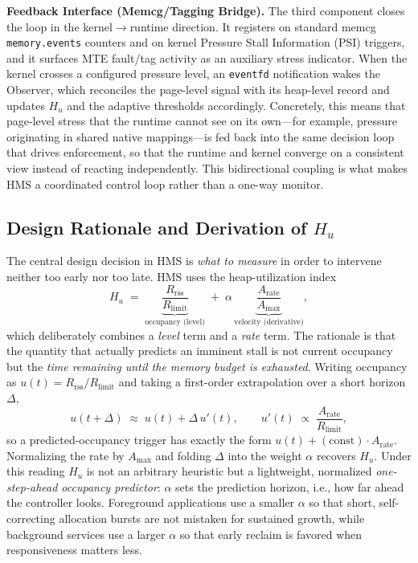 \textbf{ Feedback Interface (Memcg/Tagging Bridge).}
The third component closes the loop in the kernel$\rightarrow$runtime direction. It registers on standard memcg \texttt{memory.events} counters and on kernel Pressure Stall Information (PSI) triggers, and it surfaces MTE fault/tag activity as an auxiliary stress indicator. When the kernel crosses a configured pressure level, an \texttt{eventfd} notification wakes the Observer, which reconciles the page-level signal with its heap-level record and updates $H_u$ and the adaptive thresholds accordingly. Concretely, this means that page-level stress that the runtime cannot see on its own---for example, pressure originating in shared native mappings---is fed back into the same decision loop that drives enforcement, so that the runtime and kernel converge on a consistent view instead of reacting independently. This bidirectional coupling is what makes HMS a coordinated control loop rather than a one-way monitor.

\subsection{Design Rationale and Derivation of $H_u$}
\label{subsec_rationale}
The central design decision in HMS is \emph{what to measure} in order to intervene neither too early nor too late. HMS uses the heap-utilization index
\[
H_u \;=\; \underbrace{\frac{R_{\mathrm{rss}}}{R_{\mathrm{limit}}}}_{\text{occupancy (level)}} \;+\; \alpha\,\underbrace{\frac{A_{\mathrm{rate}}}{A_{\mathrm{max}}}}_{\text{velocity (derivative)}} ,
\]
which deliberately combines a \emph{level} term and a \emph{rate} term. The rationale is that the quantity that actually predicts an imminent stall is not current occupancy but the \emph{time remaining until the memory budget is exhausted}. Writing occupancy as $u(t)=R_{\mathrm{rss}}/R_{\mathrm{limit}}$ and taking a first-order extrapolation over a short horizon $\Delta$,
\[
u(t+\Delta)\;\approx\;u(t)+\Delta\,u'(t),\qquad u'(t)\;\propto\;\frac{A_{\mathrm{rate}}}{R_{\mathrm{limit}}},
\]
so a predicted-occupancy trigger has exactly the form $u(t) + (\text{const})\cdot A_{\mathrm{rate}}$. Normalizing the rate by $A_{\mathrm{max}}$ and folding $\Delta$ into the weight $\alpha$ recovers $H_u$. Under this reading $H_u$ is not an arbitrary heuristic but a lightweight, normalized \emph{one-step-ahead occupancy predictor}: $\alpha$ sets the prediction horizon, i.e., how far ahead the controller looks. Foreground applications use a smaller $\alpha$ so that short, self-correcting allocation bursts are not mistaken for sustained growth, while background services use a larger $\alpha$ so that early reclaim is favored when responsiveness matters less.

